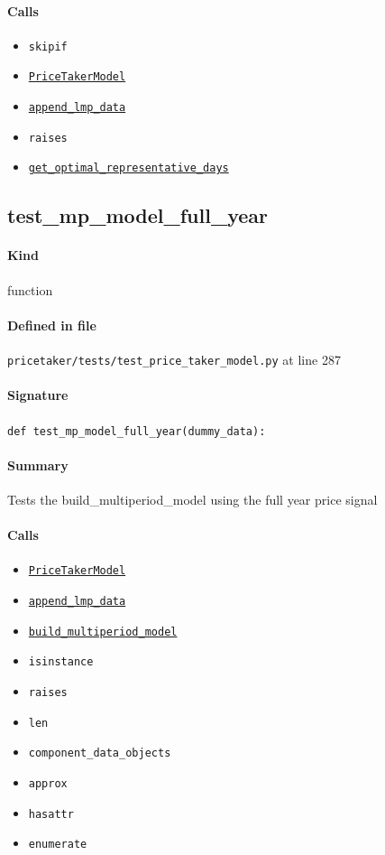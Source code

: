 \documentclass[11pt]{report}
\begin{document}
\paragraph{Calls}
\begin{itemize}[leftmargin=*]
  \item \texttt{skipif}
  \item \hyperref[def:pricetaker-price_taker_model.py:PriceTakerModel:L161]{\texttt{PriceTakerModel}}
  \item \hyperref[def:pricetaker-price_taker_model.py:PriceTakerModel.append_lmp_data:L221]{\texttt{append\_lmp\_data}}
  \item \texttt{raises}
  \item \hyperref[def:pricetaker-price_taker_model.py:PriceTakerModel.get_optimal_representative_days:L262]{\texttt{get\_optimal\_representative\_days}}
\end{itemize}
\subsection{test\_mp\_model\_full\_year}
\label{def:pricetaker-tests-test_price_taker_model.py:test_mp_model_full_year:L287}
\paragraph{Kind} function
\paragraph{Defined in file} \texttt{pricetaker/tests/test\_price\_taker\_model.py} at line 287
\paragraph{Signature} \texttt{def test\_mp\_model\_full\_year(dummy\_data):}
\paragraph{Summary} Tests the build\_multiperiod\_model using the full year price signal
\paragraph{Calls}
\begin{itemize}[leftmargin=*]
  \item \hyperref[def:pricetaker-price_taker_model.py:PriceTakerModel:L161]{\texttt{PriceTakerModel}}
  \item \hyperref[def:pricetaker-price_taker_model.py:PriceTakerModel.append_lmp_data:L221]{\texttt{append\_lmp\_data}}
  \item \hyperref[def:pricetaker-price_taker_model.py:PriceTakerModel.build_multiperiod_model:L291]{\texttt{build\_multiperiod\_model}}
  \item \texttt{isinstance}
  \item \texttt{raises}
  \item \texttt{len}
  \item \texttt{component\_data\_objects}
  \item \texttt{approx}
  \item \texttt{hasattr}
  \item \texttt{enumerate}
\end{itemize}
\end{document}
